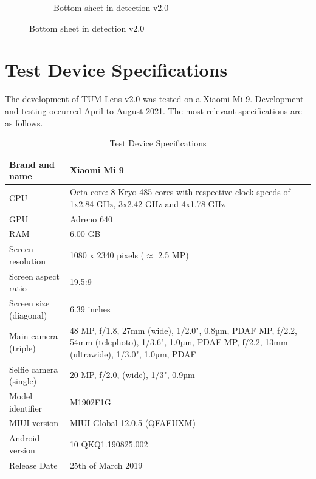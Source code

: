 \documentclass[
			   fontsize=11pt,
               paper=a4,
               bibliography=totoc,
               idxtotoc,
               headsepline,
               footsepline,
               footinclude=false,
               BCOR=12mm,
               DIV=13,
               openany,   %
               oneside    %
               ]
               {scrbook}
\begin{document}
\begin{figure}[H]
\begin{subfigure}{.23\textwidth}
		\caption[Screenshots of the new app in version 2.0 showing the detection activity with its bottom sheet expanded]{Bottom sheet in detection v2.0}
		\label{fig:appImage23}
	\end{subfigure}
\end{figure}


\chapter{Test Device Specifications} \label{chap:specs}

The development of TUM-Lens v2.0 was tested on a Xiaomi Mi 9. Development and testing occurred April to August 2021. The most relevant specifications are as follows. 

\begin{table}[h]
	\begin{tabularx}{\columnwidth}
		{ >{\RaggedRight}p{4cm} | L }
		\hline
		Brand and name	&	Xiaomi Mi 9	\\	\hline
		CPU	&	Octa-core: 8 Kryo 485 cores with respective clock speeds of 1x2.84 GHz, 3x2.42 GHz and 4x1.78 GHz	\\	\hline
		GPU	&	Adreno 640	\\	\hline
		RAM	&	6.00 GB	\\	\hline
		Screen resolution	&	1080 x 2340 pixels ($\approx$ 2.5 MP)	\\	\hline
		Screen aspect ratio	&	19.5:9 \\ \hline
		Screen size (diagonal)	&	6.39 inches	\\	\hline
		Main camera (triple)	&	48 MP, f/1.8, 27mm (wide), 1/2.0", 0.8µm, PDAF  MP, f/2.2, 54mm (telephoto), 1/3.6", 1.0µm, PDAF  MP, f/2.2, 13mm (ultrawide), 1/3.0", 1.0µm, PDAF	\\	\hline
		Selfie camera (single)	& 20 MP, f/2.0, (wide), 1/3", 0.9µm \\ \hline
		Model identifier	&	M1902F1G	\\	\hline
		MIUI version	&	MIUI Global 12.0.5 (QFAEUXM)	\\	\hline
		Android version	&	10 QKQ1.190825.002	\\	\hline
		Release Date	&	25th of March 2019	\\	\hline
	\end{tabularx}
	\caption[Test Device Specifications]{Test Device Specifications}
	\label{tab:specs}
\end{table}


\listoffigures

\listoftables

\printbibliography

\printglossary[type=acronym,nonumberlist]

\printglossary[type=main,nonumberlist]
\end{document}
